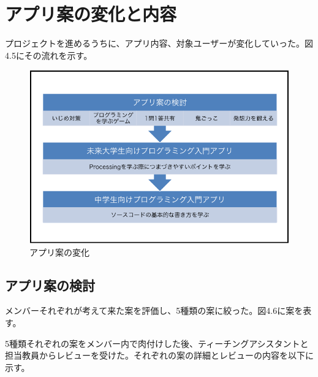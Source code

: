 \documentclass[openany,11pt,papersize]{jsbook}
\begin{document}

\section{アプリ案の変化と内容}
\par プロジェクトを進めるうちに、アプリ内容、対象ユーザーが変化していった。図4.5にその流れを示す。

\begin{figure}[H]
\begin{center}
\includegraphics[width=12cm, bb=0 0 720 480]{img/appChangeFirstTerm.png}
\end{center}
\caption{アプリ案の変化}
\end{figure}


\subsection{アプリ案の検討}
\par メンバーそれぞれが考えて来た案を評価し、5種類の案に絞った。図4.6に案を表す。

\par 5種類それぞれの案をメンバー内で肉付けした後、ティーチングアシスタントと担当教員からレビューを受けた。それぞれの案の詳細とレビューの内容を以下に示す。
\end{document}

